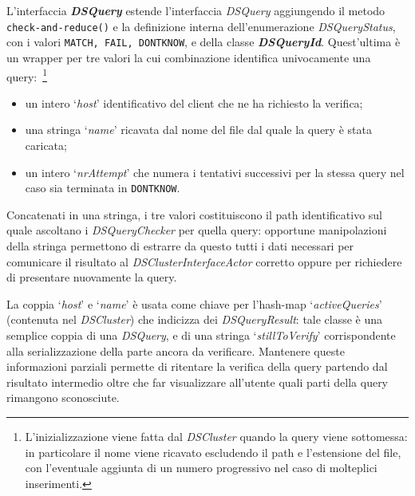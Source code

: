L'interfaccia \textbf{\emph{DSQuery}} estende l'interfaccia
\emph{DSQuery} aggiungendo il metodo \texttt{check-and-reduce()} e la
definizione interna dell'enumerazione \emph{DSQueryStatus},
con i valori \texttt{MATCH, FAIL, DONTKNOW}, e della classe
\textbf{\emph{DSQueryId}}.
Quest'ultima è un wrapper per tre valori la cui
combinazione identifica univocamente una query:~\footnote{
    L'inizializzazione viene fatta dal \emph{DSCluster} quando la
    query viene sottomessa: in particolare il nome viene ricavato
    escludendo il path e l'estensione del file, con l'eventuale
    aggiunta di un numero progressivo nel caso di molteplici
    inserimenti.}
\begin{itemize}
\item un intero `\emph{host}' identificativo del client che ne ha
  richiesto la verifica;
\item una stringa `\emph{name}' ricavata dal nome del file dal quale
  la query è stata caricata;
\item un intero `\emph{nrAttempt}' che numera i tentativi successivi
  per la stessa query nel caso sia terminata in \texttt{DONTKNOW}.
\end{itemize}
Concatenati in una stringa, i tre valori costituiscono il path
identificativo sul quale ascoltano i \emph{DSQueryChecker}
per quella query: opportune manipolazioni della stringa permettono
di estrarre da questo tutti i dati necessari per comunicare
il risultato al \emph{DSClusterInterfaceActor} corretto oppure
per richiedere di presentare nuovamente la query.

La coppia `\emph{host}' e `\emph{name}' è usata come chiave
per l'hash-map `\emph{activeQueries}' (contenuta nel \emph{DSCluster})
che indicizza dei \emph{DSQueryResult}: tale classe è una semplice
coppia di una \emph{DSQuery}, e di una stringa `\emph{stillToVerify}'
corrispondente alla serializzazione della parte ancora da verificare.
Mantenere queste informazioni parziali permette di ritentare la
verifica della query partendo dal risultato intermedio oltre che
far visualizzare all'utente quali parti della query
rimangono sconosciute.\\

